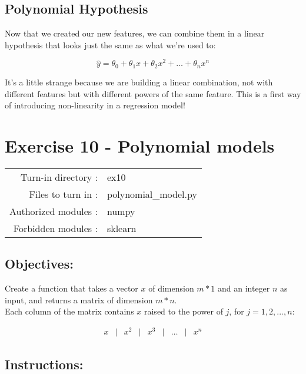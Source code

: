 \documentclass[]{article}
\begin{document}
\hypertarget{polynomial-hypothesis}{%
\subsection{Polynomial Hypothesis}\label{polynomial-hypothesis}}

Now that we created our new features, we can combine them in a linear
hypothesis that looks just the same as what we're used to:

\large

\[
\hat{y} = \theta_0 + \theta_1 x  +\theta_2 x^{2} + \dots + \theta_n x^{n}
\] \normalsize

It's a little strange because we are building a linear combination, not
with different features but with different powers of the same feature.
This is a first way of introducing non-linearity in a regression model!

\clearpage

\hypertarget{exercise-10---polynomial-models-1}{%
\section{Exercise 10 - Polynomial
models}\label{exercise-10---polynomial-models-1}}

\begin{longtable}[]{@{}rl@{}}
\toprule
\endhead
Turn-in directory : & ex10\tabularnewline
Files to turn in : & polynomial\_model.py\tabularnewline
Authorized modules : & numpy\tabularnewline
Forbidden modules : & sklearn\tabularnewline
\bottomrule
\end{longtable}

\hypertarget{objectives-7}{%
\subsection{Objectives:}\label{objectives-7}}

Create a function that takes a vector \(x\) of dimension \(m * 1\) and
an integer \(n\) as input, and returns a matrix of dimension
\(m * n\).\\
Each column of the matrix contains \(x\) raised to the power of \(j\),
for \(j = 1, 2, ..., n\):

\large

\[
\begin{matrix}
x &|& x^2 &|& x^3 &|& \ldots &|& x^n
\end{matrix}
\] \normalsize

\hypertarget{instructions-10}{%
\subsection{Instructions:}\label{instructions-10}}
\end{document}
